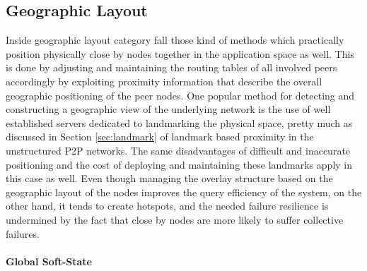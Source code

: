 \documentclass[acmcsur,acmnow]{acmtrans2m}
\begin{document}

\subsection{Geographic Layout}

Inside geographic layout category fall those kind of methods which practically position physically close by nodes together in the application space as well. This is done by adjusting and maintaining the routing tables of all involved peers accordingly by exploiting proximity information that describe the overall geographic positioning of the peer nodes. One popular method for detecting and constructing a geographic view of the underlying network is the use of well established servers dedicated to landmarking the physical space, pretty much as discussed in Section \ref{sec:landmark} of landmark based proximity in the unstructured P2P networks. The same disadvantages of difficult and inaccurate positioning and the cost of deploying and maintaining these landmarks apply in this case as well.
Even though managing the overlay structure based on the geographic layout of the nodes improves the query efficiency of the system, on the other hand, it tends to create hotspots, and the needed failure resilience is undermined by the fact that close by nodes are more likely to suffer collective failures.

\paragraph*{\bf Global Soft-State}
\end{document}
